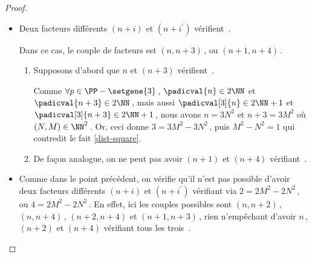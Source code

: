 \begin{proof}
\begin{itemize}
    	\item Deux facteurs différents $(n+i)$ et $(n+i^\prime)$ vérifient \,.
		
		\noindent
		Dans ce cas, le couple de facteurs est $(n, n + 3)$\,, ou $(n + 1, n + 4)$\,.    
		\begin{enumerate}
			\item Supposons d'abord que $n$ et $(n+3)$ vérifient \,.
			
			\noindent
			Comme $\forall p \in \PP - \setgene{3}$\,, $\padicval{n} \in 2 \NN$ et $\padicval{n + 3} \in 2 \NN$\,,
			mais aussi $\padicval[3]{n} \in 2 \NN + 1$ et $\padicval[3]{n + 3} \in 2 \NN + 1$\,,
			nous avons $n = 3 N^2$ et $n+3 = 3 M^2$ où $(N, M) \in \NN^2$\,.
			Or, ceci donne $3 = 3 M^2 - 3 N^2$\,, puis $M^2 - N^2 = 1$ qui contredit le fait \ref{dist-square}.

			\item De façon analogue, on ne peut pas avoir $(n+1)$ et $(n+4)$ vérifiant \,.
		\end{enumerate}


    	\item Comme dans le point précédent, on vérifie qu'il n'est pas possible d'avoir deux facteurs différents $(n+i)$ et $(n+i^\prime)$ vérifiant  via $2 = 2 M^2 - 2 N^2$\,, ou $4 = 2 M^2 - 2 N^2$\,. 
	En effet, ici les couples possibles sont $(n, n + 2)$\,, $(n, n + 4)$\,,  $(n + 2, n + 4)$ et $(n + 1, n + 3)$\,, rien n'empêchant d'avoir $n$\,, $(n + 2)$ et $(n + 4)$ vérifiant tous les trois \,.
    \end{itemize}
\end{proof}





